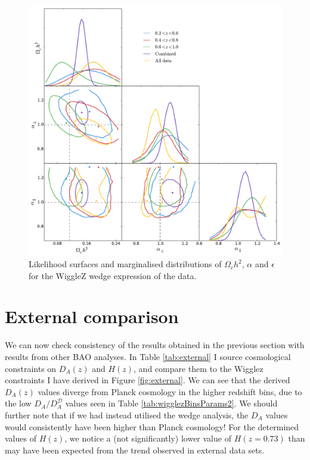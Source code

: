 \documentclass[titlesmallcaps, examinerscopy, copyrightpage]{uqthesis}
\begin{document}
\begin{figure}[h!]
  \begin{center}
    \includegraphics[width=\textwidth]{images/corCombinedWedgeWig.pdf}
  \end{center}
  \caption{Likelihood surfaces and marginalised distributions of $\Omega_ch^2$, $\alpha$ and $\epsilon$ for the WiggleZ wedge expression of the data. }
  \label{fig:wigglezBinsWdg}
\end{figure}


\clearpage
\section{External comparison}


We can now check consistency of the results obtained in the previous section with results from other BAO analyses. In Table \ref{tab:external} I source cosmological constraints on $D_A(z)$ and $H(z)$, and compare them to the Wigglez constraints I have derived in Figure \ref{fig:external}. We can see that the derived $D_A(z)$ values diverge from Planck cosmology in the higher redshift bins, due to the low $D_A/D^{\mathcal{D}}_A$ values seen in Table \ref{tab:wigglezBinsParams2}. We should further note that if we had instead utilised the wedge analysis, the $D_A$ values would consistently have been higher than Planck cosmology! For the determined values of $H(z)$, we notice a (not significantly) lower value of $H(z = 0.73)$ than may have been expected from the trend observed in external data sets.\\
\end{document}
